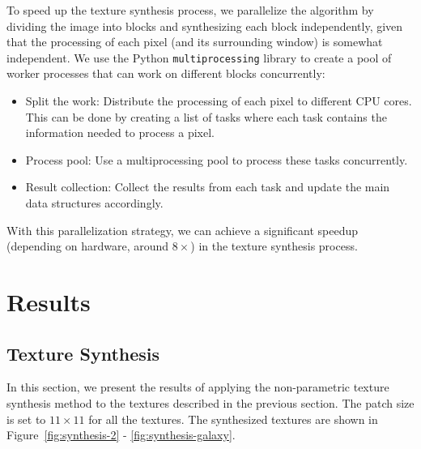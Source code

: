 \documentclass{article}
\begin{document}
To speed up the texture synthesis process, we parallelize the algorithm by dividing the image into blocks and synthesizing each block independently, given that the processing of each pixel (and its surrounding window) is somewhat independent.
We use the Python \texttt{multiprocessing} library to create a pool of worker processes that can work on different blocks concurrently:
\begin{itemize}
    \item {Split the work:} Distribute the processing of each pixel to different CPU cores. This can be done by creating a list of tasks where each task contains the information needed to process a pixel.
    \item {Process pool:} Use a multiprocessing pool to process these tasks concurrently.
    \item {Result collection:} Collect the results from each task and update the main data structures accordingly.
\end{itemize}
With this parallelization strategy, we can achieve a significant speedup (depending on hardware, around $8\times$) in the texture synthesis process.

\section{Results}
\subsection{Texture Synthesis}
In this section, we present the results of applying the non-parametric texture synthesis method to the textures described in the previous section.
The patch size is set to $11 \times 11$ for all the textures.
The synthesized textures are shown in Figure~\ref{fig:synthesis-2} - \ref{fig:synthesis-galaxy}.
\end{document}
